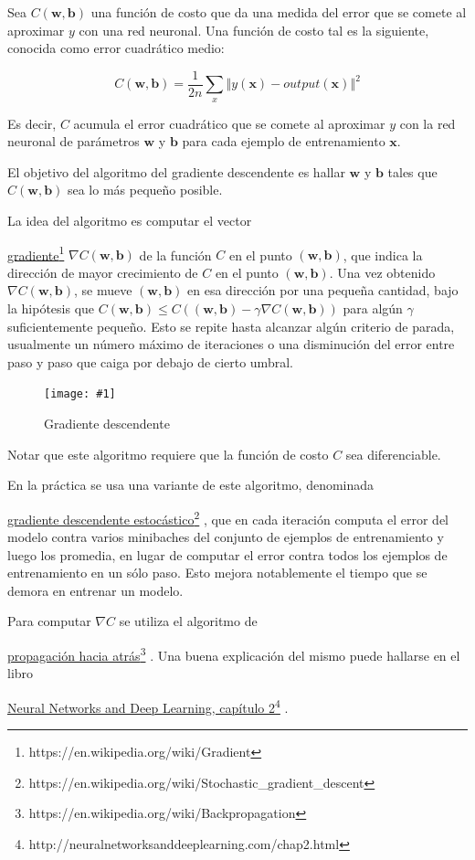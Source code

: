 \documentclass[a4paper, 10pt, twoside]{article}
\newcommand{\img}[3]{
  \begin{figure}[H]
    \begin{center}
      \texttt{[image: \#1]}
    \end{center}
    \caption{#2}
    \label{#3}
  \end{figure}
}
\newcommand{\link}[2]{
  \href{#1}{#2}\footnote{#1}
}
\begin{document}
Sea $C(\bm{w}, \bm{b})$ una función de costo que da una medida del error que se
comete al aproximar $y$ con una red neuronal. Una función de costo tal es la
siguiente, conocida como error cuadrático medio:

$$C(\bm{w}, \bm{b}) = \frac{1}{2n} \sum_x \left\Vert
                                          y(\bm{\bm{x}}) -
                                          \mathit{output}(\bm{x})
                                          \right\Vert^2$$

Es decir, $C$ acumula el error cuadrático que se comete al aproximar $y$ con la
red neuronal de parámetros $\bm{w}$ y $\bm{b}$ para cada ejemplo de
entrenamiento $\bm{x}$.

El objetivo del algoritmo del gradiente descendente es hallar $\bm{w}$ y
$\bm{b}$ tales que $C(\bm{w}, \bm{b})$ sea lo más pequeño posible.

La idea del algoritmo es computar el vector
\link{https://en.wikipedia.org/wiki/Gradient}{gradiente} $\nabla C(\bm{w},
\bm{b})$ de la función $C$ en el punto $(\bm{w}, \bm{b})$, que indica la
dirección de mayor crecimiento de $C$ en el punto $(\bm{w}, \bm{b})$. Una vez
obtenido $\nabla C(\bm{w}, \bm{b})$, se mueve $(\bm{w}, \bm{b})$ en esa
dirección por una pequeña cantidad, bajo la hipótesis que $C(\bm{w}, \bm{b})
\leq C((\bm{w}, \bm{b}) - \gamma \nabla C(\bm{w}, \bm{b}))$ para algún $\gamma$
suficientemente pequeño. Esto se repite hasta alcanzar algún criterio de
parada, usualmente un número máximo de iteraciones o una disminución del error
entre paso y paso que caiga por debajo de cierto umbral.

\img{gradient-descent.png}{Gradiente descendente}{img:gradient-descent}

Notar que este algoritmo requiere que la función de costo $C$ sea diferenciable.

En la práctica se usa una variante de este algoritmo, denominada
\link{https://en.wikipedia.org/wiki/Stochastic_gradient_descent}{gradiente
descendente estocástico}, que en cada iteración computa el error del modelo
contra varios minibaches del conjunto de ejemplos de entrenamiento y luego los
promedia, en lugar de computar el error contra todos los ejemplos de
entrenamiento en un sólo paso. Esto mejora notablemente el tiempo que se demora
en entrenar un modelo.

Para computar $\nabla C$ se utiliza el algoritmo de
\link{https://en.wikipedia.org/wiki/Backpropagation}{propagación hacia atrás}.
Una buena explicación del mismo puede hallarse en el libro
\link{http://neuralnetworksanddeeplearning.com/chap2.html}{Neural Networks and
Deep Learning, capítulo 2}.
\end{document}
